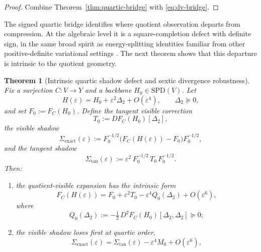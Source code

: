 \documentclass[11pt]{article}
\numberwithin{equation}{section}
\newcommand{\SPD}{\mathrm{SPD}}
\newcommand{\eps}{\varepsilon}
\theoremstyle{thmcompact}
\newtheorem{theorem}{Theorem}[section]
\theoremstyle{remark}
\begin{document}
\begin{proof}
Combine Theorem~\ref{thm:quartic-bridge} with \eqref{eq:dv-bridge}.
\end{proof}

The signed quartic bridge identifies where quotient observation departs from compression. At the algebraic level it is a square-completion defect with definite sign, in the same broad spirit as energy-splitting identities familiar from other positive-definite variational settings \cite{Bogomolnyi1976}. The next theorem shows that this departure is intrinsic to the quotient geometry.

\begin{theorem}[Intrinsic quartic shadow defect and sextic divergence robustness]
\label{thm:shadow-sextic}
Fix a surjection $C : V \to Y$ and a backbone $H_0 \in \SPD(V)$. Let
\begin{equation}
H(\eps) = H_0 + \eps^2 \Delta_2 + O(\eps^4),
\qquad
\Delta_2 \succeq 0,
\label{eq:dv-general-family}
\end{equation}
and set $F_0 := F_C(H_0)$. Define the tangent visible correction
\begin{equation}
T_0 := DF_C(H_0)[\Delta_2],
\label{eq:tangent-visible-correction}
\end{equation}
the visible shadow
\begin{equation}
\Sigma_{\mathrm{exact}}(\eps)
:=
F_0^{-1/2}\bigl(F_C(H(\eps)) - F_0\bigr)F_0^{-1/2},
\label{eq:exact-shadow}
\end{equation}
and the tangent shadow
\begin{equation}
\Sigma_{\mathrm{tan}}(\eps)
:=
\eps^2\, F_0^{-1/2}\, T_0\, F_0^{-1/2}.
\label{eq:tangent-shadow}
\end{equation}
Then:
\begin{enumerate}
\item the quotient-visible expansion has the intrinsic form
\begin{equation}
F_C(H(\eps))
=
F_0 + \eps^2 T_0 - \eps^4 Q_0(\Delta_2) + O(\eps^6),
\label{eq:hessian-defect-expansion}
\end{equation}
where
\begin{equation}
Q_0(\Delta_2) := -\tfrac{1}{2}\, D^2 F_C(H_0)[\Delta_2, \Delta_2] \succeq 0;
\label{eq:hessian-defect}
\end{equation}
\item the visible shadow loses first at quartic order,
\begin{equation}
\Sigma_{\mathrm{exact}}(\eps)
=
\Sigma_{\mathrm{tan}}(\eps) - \eps^4 M_0 + O(\eps^6),

\end{equation}
\end{enumerate}
\end{theorem}
\end{document}
